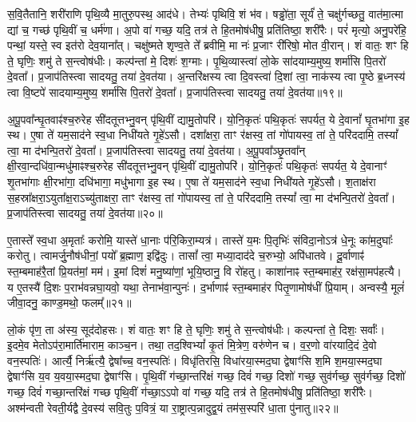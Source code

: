 स॒वि॒तैतानि॒ शरी॑राणि पृथि॒व्यै मा॒तुरु॒पस्थ॒ आद॑धे। 
तेभ्यः॑ पृथिवि॒ शं भ॑व। 
षड्ढो॑ता॒ सूर्यं॑ ते॒ चक्षु॑र्गच्छतु॒ वात॑मा॒त्मा द्यां च॒ गच्छ॑ पृथि॒वीं च॒ धर्म॑णा। 
अ॒पो वा॑ गच्छ॒ यदि॒ तत्र॑ ते हि॒तमोष॑धीषु॒ प्रति॑तिष्ठा॒ शरी॑रैः। 
परं॑ मृत्यो॒ अनु॒परे॑हि॒ पन्थां॒ यस्ते॒ स्व इत॑रो देव॒याना᳚त्। 
चक्षु॑ष्मते शृण्व॒ते ते᳚ ब्रवीमि॒ मा नः॑ प्र॒जाꣳ री॑रिषो॒ मोत वी॒रान्। 
शं वातः॒ शꣳ हि ते॒ घृणिः॒ शमु॑ ते स॒न्त्वोष॑धीः। 
कल्प॑न्तां मे॒ दिशः॑ श॒ग्माः। 
पृ॒थि॒व्यास्त्वा॑ लो॒के सा॑दयाम्य॒मुष्य॒ शर्मा॑सि पि॒तरो॑ दे॒वता᳚। 
प्र॒जाप॑तिस्त्वा सादयतु॒ तया॑ दे॒वत॑या। 
अ॒न्तरि॑क्षस्य त्वा दि॒वस्त्वा॑ दि॒शां त्वा॒ नाक॑स्य त्वा पृ॒ष्ठे ब्र॒ध्नस्य॑ त्वा वि॒ष्टपे॑ सादयाम्य॒मुष्य॒ शर्मा॑सि पि॒तरो॑ दे॒वता᳚। 
प्र॒जाप॑तिस्त्वा सादयतु॒ तया॑ दे॒वत॑या॥१९॥\ip

अ॒पू॒पवा᳚न्घृ॒तवाꣴ॑श्च॒रुरेह सी॑दतूत्तभ्नु॒वन् पृ॑थि॒वीं द्यामु॒तोपरि॑। 
यो॒नि॒कृतः॑ पथि॒कृतः॑ सपर्यत॒ ये दे॒वानां᳚ घृ॒तभा॑गा इ॒ह स्थ। 
ए॒षा ते॑ यम॒साद॑ने स्व॒धा निधी॑यते गृ॒हे॑ऽसौ। 
दशा᳚क्षरा॒ ताꣳ र॑क्षस्व॒ तां गो॑पायस्व॒ तां ते॒ परि॑ददामि॒ तस्यां᳚ त्वा॒ मा द॑भन्पि॒तरो॑ दे॒वता᳚। 
प्र॒जाप॑तिस्त्वा सादयतु॒ तया॑ दे॒वत॑या। 
अ॒पू॒पवा᳚ञ्छृ॒तवा᳚न् क्षी॒रवा॒न्दधि॑वा॒न्मधु॑माꣴश्च॒रुरेह सी॑दतूत्तभ्नु॒वन् पृ॑थि॒वीं द्यामु॒तोपरि॑। 
यो॒नि॒कृतः॑ पथि॒कृतः॑ सपर्यत॒ ये दे॒वानाꣳ॑ शृ॒तभा॑गाः क्षी॒रभा॑गा॒ दधि॑भागा॒ मधु॑भागा इ॒ह स्थ। 
ए॒षा ते॑ यम॒साद॑ने स्व॒धा निधी॑यते गृ॒हे॑ऽसौ। 
श॒ताक्ष॑रा स॒हस्रा᳚क्षरा॒ऽयुता᳚क्ष॒राऽच्यु॑ताक्षरा॒ ताꣳ र॑क्षस्व॒ तां गो॑पायस्व॒ तां ते॒ परि॑ददामि॒ तस्यां᳚ त्वा॒ मा द॑भन्पि॒तरो॑ दे॒वता᳚। 
प्र॒जाप॑तिस्त्वा सादयतु॒ तया॑ दे॒वत॑या॥२०॥\ip
\anuvakamend[अन॑पस्फुरन्ती॒रुत्त॑र दे॒वत॑या॒ द्वे च॑]

ए॒तास्ते᳚ स्व॒धा अ॒मृताः᳚ करोमि॒ यास्ते॑ धा॒नाः प॑रि॒किरा॒म्यत्र॑। 
तास्ते॑ य॒मः पि॒तृभिः॑ संविदा॒नोऽत्र॑ धे॒नूः का॑म॒दुघाः᳚ करोतु। 
त्वामर्जु॒नौष॑धीनां॒ पयो᳚ ब्र॒ह्माण॒ इद्वि॑दुः। 
तासां᳚ त्वा॒ मध्या॒दाद॑दे च॒रुभ्यो॒ अपि॑धातवे। 
दू॒र्वाणाꣴ॑ स्त॒म्बमाह॑रै॒तां प्रि॒यत॑मां॒ मम॑। 
इ॒मां दिशं॑ मनु॒ष्या॑णां॒ भूयि॒ष्ठानु॒ वि रो॑हतु। 
काशा॑नाꣴ स्त॒म्बमाह॑र॒ रक्ष॑सा॒मप॑हत्यै। 
य ए॒तस्यै॑ दि॒शः प॒राभ॑वन्नघा॒यवो॒ यथा॒ तेनाभ॑वा॒न्पुनः॑। 
द॒र्भाणाꣴ॑ स्त॒म्बमाह॑र पितृ॒णामोष॑धीं प्रि॒याम्। 
अन्वस्यै॒ मूलं॑ जीवा॒दनु॒ काण्ड॒मथो॒ फलम्᳚॥२१॥\ip

लो॒कं पृ॑ण॒ ता अ॑स्य॒ सूद॑दोहसः। 
शं वातः॒ शꣳ हि ते॒ घृणिः॒ शमु॑ ते स॒न्त्वोष॑धीः। 
कल्पन्तां ते॒ दिशः॒ सर्वाः᳚। 
इ॒दमे॒व मेतोऽप॑रा॒मार्ति॑माराम॒ काञ्च॒न। 
तथा॒ तद॒श्विभ्यां᳚ कृ॒तं मि॒त्रेण॒ वरु॑णेन च। 
व॒र॒णो वा॑रयादि॒दं दे॒वो वन॒स्पतिः॑। 
आर्त्यै॒ निर्\mbox{}ऋ॑त्यै॒ द्वेषा᳚च्च॒ वन॒स्पतिः॑। 
विधृ॑तिरसि॒ विधा॑रया॒स्मद॒घा द्वेषाꣳ॑सि श॒मि श॒मया॒स्मद॒घा द्वेषाꣳ॑सि य॒व य॒वया॒स्मद॒घा द्वेषाꣳ॑सि। 
पृ॒थि॒वीं ग॑च्छा॒न्तरि॑क्षं गच्छ॒ दिवं॑ गच्छ॒ दिशो॑ गच्छ॒ सुव॑र्गच्छ॒ सुव॑र्गच्छ॒ दिशो॑ गच्छ॒ दिवं॑ गच्छा॒न्तरि॑क्षं गच्छ पृथि॒वीं ग॑च्छा॒ऽऽपो वा॑ गच्छ॒ यदि॒ तत्र॑ ते हि॒तमोष॑धीषु॒ प्रति॑तिष्ठा॒ शरी॑रैः। 
अश्म॑न्वती रेवती॒र्यद्वै दे॒वस्य॑ सवि॒तुः प॒वित्रं॒ या रा॒ष्ट्रात्प॒न्नादुद्व॒यं तम॑स॒स्परि॑ धा॒ता पु॑नातु॥२२॥\ip
\anuvakamend[फलं॑ पुनातु]


